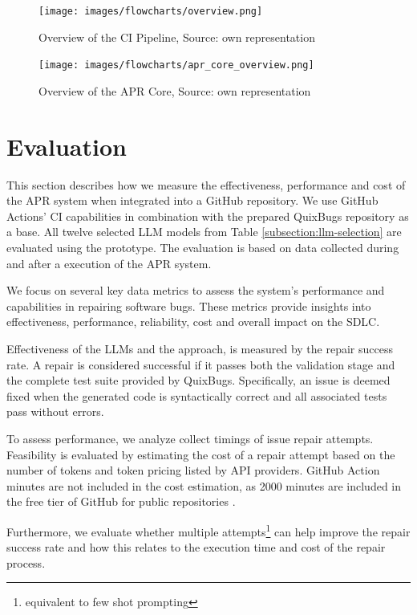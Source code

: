 \begin{figure}[H]
    \centering
    \texttt{[image: images/flowcharts/overview.png]}
    \caption{Overview of the CI Pipeline, Source: own representation}
    \label{fig:high-level}
\end{figure}

\begin{figure}[H]
    \centering
    \texttt{[image: images/flowcharts/apr\_core\_overview.png]}
    \caption{Overview of the APR Core, Source: own representation}
    \label{fig:apr-core-overview}
\end{figure}



\section{Evaluation} \label{section:evaluation}
This section describes how we measure the effectiveness, performance and cost of the APR system when integrated into a GitHub repository. We use GitHub Actions' \ac{CI} capabilities in combination with the prepared QuixBugs repository as a base. All twelve selected LLM models from Table \ref{subsection:llm-selection} are evaluated using the prototype. The evaluation is based on data collected during and after a execution of the APR system.

We focus on several key data metrics to assess the system's performance and capabilities in repairing software bugs. These metrics provide insights into effectiveness, performance, reliability, cost and overall impact on the \ac{SDLC}.

Effectiveness of the \acp{LLM} and the approach, is measured by the repair success rate. A repair is considered successful if it passes both the validation stage and the complete test suite provided by QuixBugs. Specifically, an issue is deemed fixed when the generated code is syntactically correct and all associated tests pass without errors.

To assess performance, we analyze collect timings of issue repair attempts. Feasibility is evaluated by estimating the cost of a repair attempt based on the number of tokens and token pricing listed by API providers. GitHub Action minutes are not included in the cost estimation, as 2000 minutes are included in the free tier of GitHub for public repositories \cite{GitHubsPlans}.

Furthermore, we evaluate whether multiple attempts\footnote{equivalent to few shot prompting} can help improve the repair success rate and how this relates to the execution time and cost of the repair process.

